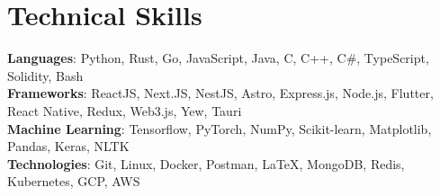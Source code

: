     \resumeSubHeadingListEnd
\vspace{-15pt}

%
\section{Technical Skills}
 \begin{itemize}[leftmargin=0.15in,label={}]
    \small{\item{
     \textbf{Languages}{: Python, Rust, Go, JavaScript, Java, C, C++, C\#, TypeScript, Solidity, Bash} \\
     \textbf{Frameworks}{: ReactJS, Next.JS, NestJS, Astro, Express.js, Node.js, Flutter, React Native, Redux, Web3.js, Yew, Tauri} \\
     \textbf{Machine Learning}{: Tensorflow, PyTorch, NumPy, Scikit-learn, Matplotlib, Pandas, Keras, NLTK} \\
     \textbf{Technologies}{: Git, Linux, Docker, Postman, \LaTeX, MongoDB, Redis, Kubernetes, GCP, AWS } \\
    }}
 \end{itemize}
 \vspace{-16pt}
